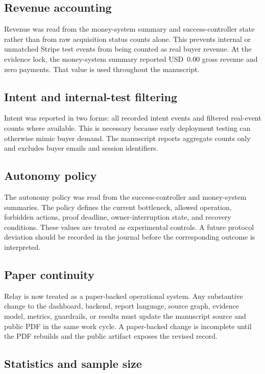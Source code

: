 \documentclass[12pt,letterpaper]{article}
\begin{document}
\subsection{Revenue accounting}

Revenue was read from the money-system summary and success-controller state rather than from raw acquisition status counts alone. This prevents internal or unmatched Stripe test events from being counted as real buyer revenue. At the evidence lock, the money-system summary reported USD~0.00 gross revenue and zero payments. That value is used throughout the manuscript.

\subsection{Intent and internal-test filtering}

Intent was reported in two forms: all recorded intent events and filtered real-event counts where available. This is necessary because early deployment testing can otherwise mimic buyer demand. The manuscript reports aggregate counts only and excludes buyer emails and session identifiers.

\subsection{Autonomy policy}

The autonomy policy was read from the success-controller and money-system summaries. The policy defines the current bottleneck, allowed operation, forbidden actions, proof deadline, owner-interruption state, and recovery conditions. These values are treated as experimental controls. A future protocol deviation should be recorded in the journal before the corresponding outcome is interpreted.

\subsection{Paper continuity}

Relay is now treated as a paper-backed operational system. Any substantive change to the dashboard, backend, report language, source graph, evidence model, metrics, guardrails, or results must update the manuscript source and public PDF in the same work cycle. A paper-backed change is incomplete until the PDF rebuilds and the public artifact exposes the revised record.

\subsection{Statistics and sample size}
\end{document}
